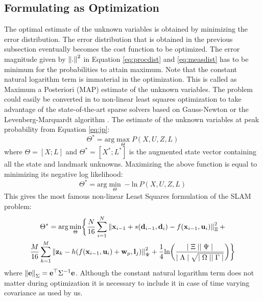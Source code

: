 \subsection{Formulating as Optimization}
The optimal estimate of the unknown variables is obtained by minimizing the error distribution. The error distribution that is obtained in the previous subsection eventually becomes the cost function to be optimized. The error magnitude given by $\left\lVert.\right\rVert^2$ in Equation \ref{eq:procdist} and \ref{eq:measdist} has to be minimum for the probabilities to attain maximum. Note that the constant natural logarithm term is immaterial in the optimization. This is called as Maximum a Posteriori (MAP) estimate of the unknown variables. The problem could easily be converted in to non-linear least squares optimization to take advantage of the state-of-the-art sparse solvers based on Gauss-Newton or the Levenberg-Marquardt algorithm \cite{lsopt}. The estimate of the unknown variables at peak probability from Equation \ref{eq:jp}:
\begin{equation}
\Theta^* = \text{arg} \max_{\Theta} P(X,U,Z,L)
\end{equation}
where $\Theta = [X;L]$ and $\Theta^* = [X^*;L^*]$ is the augmented state vector containing all the state and landmark unknowns. Maximizing the above function is equal to minimizing its negative log likelihood:
\begin{equation}
\Theta^* = \text{arg} \min_{\Theta} -\text{ln} \ P(X,U,Z,L)
\end{equation}
This gives the most famous non-linear Least Squares formulation of the SLAM problem:
\begin{multline}
\Theta^* = \text{arg} \min_{\Theta} \biggl\{ \frac{N}{16} \sum_{i=1}^{N} \left\lVert\textbf{x}_{i-1} + s(\textbf{d}_{i-1}, \textbf{d}_i) - f(\textbf{x}_{i-1},\textbf{u}_i)\right\rVert_{\Xi}^2 + \\ \frac{M}{16} \sum_{k=1}^{M} \left\lVert\textbf{z}_{k} - h(f(\textbf{x}_{i-1}, \textbf{u}_i) + \textbf{w}_p, \textbf{l}_j)\right\rVert_{\Psi}^2 + \frac{1}{4} \text{ln} \biggl( \frac{\mid \Xi \mid \mid \Psi \mid}{\mid \Lambda \mid \sqrt{\mid \Omega \mid \mid \Gamma \mid}} \biggr) \biggr\}
\label{eq:lsopt}
\end{multline}
where $\left\lVert\textbf{e}\right\rVert_\Sigma = \textbf{e}^{\top}\Sigma^{-1}\textbf{e}$. Although the constant natural logarithm term does not matter during optimization it is necessary to include it in case of time varying covariance as used by us. 

